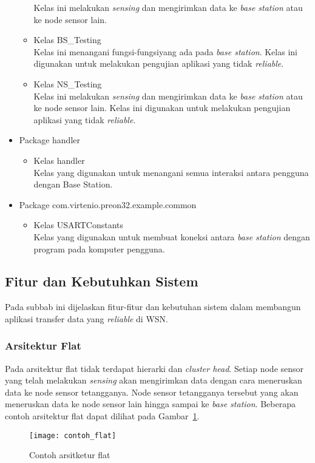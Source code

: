 \begin{itemize}
\begin{itemize}
        Kelas ini melakukan \textit{sensing} dan mengirimkan data ke \textit{base station} atau ke node sensor lain.
        \item Kelas BS\_Testing\\
        Kelas ini menangani fungsi-fungsiyang ada pada \textit{base station}. Kelas ini digunakan untuk melakukan pengujian aplikasi yang tidak \textit{reliable}.
        \item Kelas NS\_Testing\\
        Kelas ini melakukan \textit{sensing} dan mengirimkan data ke \textit{base station} atau ke node sensor lain. Kelas ini digunakan untuk melakukan pengujian aplikasi yang tidak \textit{reliable}.
    \end{itemize}
    \item Package handler
    \begin{itemize}
        \item Kelas handler\\
        Kelas yang digunakan untuk menangani semua interaksi antara pengguna dengan Base Station.
    \end{itemize}
    \item Package com.virtenio.preon32.example.common
    \begin{itemize}
        \item Kelas USARTConstants\\
        Kelas yang digunakan untuk membuat koneksi antara \textit{base station} dengan program pada komputer pengguna.
    \end{itemize}
\end{itemize}

\subsection{Fitur dan Kebutuhkan Sistem}
\label{subsec:fitur_dan_kebutuhan_sistem}
Pada subbab ini dijelaskan fitur-fitur dan kebutuhan sistem dalam membangun aplikasi transfer data yang \textit{reliable} di WSN.

\subsubsection{Arsitektur Flat}
Pada arsitektur flat tidak terdapat hierarki dan \textit{cluster head}. Setiap node sensor yang telah melakukan \textit{sensing} akan mengirimkan data dengan cara meneruskan data ke node sensor tetangganya. Node sensor tetangganya tersebut yang akan meneruskan data ke node sensor lain hingga sampai ke \textit{base station}. Beberapa contoh arsitektur flat dapat dilihat pada Gambar~\ref{fig:contoh_flat}.
\begin{figure}[htbp]
	\centering
	\texttt{[image: contoh\_flat]}
	\caption{Contoh arsitketur flat}
	\label{fig:contoh_flat}
\end{figure}


